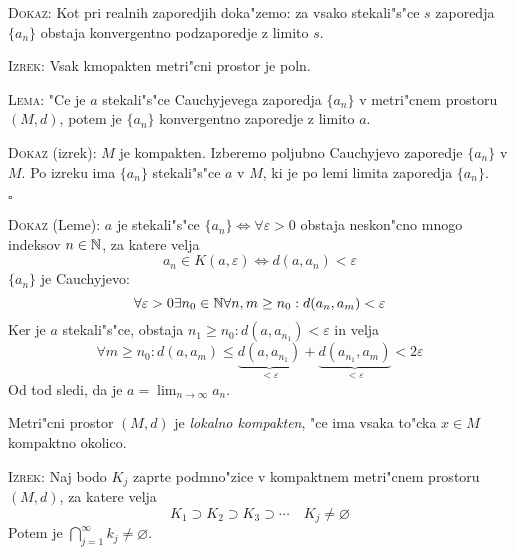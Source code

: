 \textsc{Dokaz:} Kot pri realnih zaporedjih doka"zemo: za vsako stekali"s"ce $s$ zaporedja $\{ a_n \}$ obstaja konvergentno podzaporedje z limito $s$.

\textsc{Izrek:} Vsak kmopakten metri"cni prostor je poln.

\textsc{Lema:} "Ce je $a$ stekali"s"ce Cauchyjevega zaporedja $\{ a_n \}$ v metri"cnem prostoru $(M, d)$, potem je $\{ a_n \}$ konvergentno zaporedje z limito $a$.

\textsc{Dokaz} (izrek): $M$ je kompakten. Izberemo poljubno Cauchyjevo zaporedje $\{ a_n \}$ v $M$. Po izreku ima $\{ a_n \}$ stekali"s"ce $a$ v $M$, ki je po lemi limita zaporedja $\{ a_n \}$.

\hfill $\square$

\textsc{Dokaz} (Leme): $a$ je stekali"s"ce $\{ a_n \} \iff \forall \varepsilon > 0$ obstaja neskon"cno mnogo indeksov $n \in \mathbb{N}$, za katere velja
\begin{equation*}
a_n \in K(a, \varepsilon) \iff d(a, a_n) < \varepsilon
\end{equation*}
$\{a_n\}$ je Cauchyjevo:
\begin{equation*}
\forall \varepsilon > 0 \exists n_0 \in \mathbb{N} \forall n, m \geq n_0: d(a_n, a_m) < \varepsilon
\end{equation*}
Ker je $a$ stekali"s"ce, obstaja $n_1 \geq n_0: d(a, a_{n_1}) < \varepsilon$ in velja
\begin{equation*}
\forall m \geq n_0: d(a, a_m) \leq \underbrace{d(a, a_{n_1})}_{< \varepsilon} + \underbrace{d(a_{n_1}, a_m)}_{< \varepsilon} < 2 \varepsilon
\end{equation*}
Od tod sledi, da je $a = \lim_{n \to \infty} a_n$.

 Metri"cni prostor $(M, d)$ je \emph{lokalno kompakten}, "ce ima vsaka to"cka $x \in M$ kompaktno okolico.

\textsc{Izrek:} Naj bodo $K_j$ zaprte podmno"zice v kompaktnem metri"cnem prostoru $(M, d)$, za katere velja
\begin{equation*}
K_1 \supset K_2 \supset K_3 \supset \cdots \quad K_j \neq \varnothing
\end{equation*}
Potem je $\bigcap_{j=1}^\infty k_j \neq \varnothing$.

